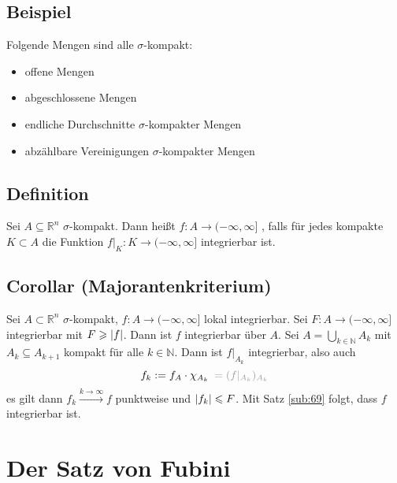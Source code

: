 \subsection[Beispiel: $\sigma$-kompakte Mengen]{Beispiel} %
\label{sub:613}
Folgende Mengen sind alle $\sigma$-kompakt:
\begin{multicols}{2}
	\begin{itemize}
		\item offene Mengen
		\item abgeschlossene Mengen
		\item endliche Durchschnitte $\sigma$-kompakter Mengen
		\item abzählbare Vereinigungen $\sigma$-kompakter Mengen
	\end{itemize}
\end{multicols}

\subsection[Definition: lokal integrierbar]{Definition} %
\label{sub:614}
Sei $A \subseteq \mathds{R}^n$ $\sigma$-kompakt. Dann heißt $f : A \to (-\infty, \infty]$ , falls für jedes kompakte $K \subset A$ die Funktion
$f|_K : K \to (-\infty,\infty]$ integrierbar ist.

\subsection{Corollar (Majorantenkriterium)} %
\label{sub:615}
Sei $A \subset \mathds{R}^n$ $\sigma$-kompakt, $f : A \to (-\infty, \infty]$ lokal integrierbar. Sei $F : A \to (-\infty, \infty]$ integrierbar mit $F\ge \abs*{f} $.
Dann ist $f$ integrierbar über $A$.
Sei $A= \bigcup_{k \in \mathds{N}} A_k$ mit $A_k \subseteq A_{k+1}$ kompakt für alle $k \in \mathds{N}$. Dann ist $f|_{A_k}$ integrierbar, also auch 
\[
	f_k := f_A \cdot \chi_{A_k} \enspace{\color{light_gray} = (f|_{A_k})_{A_k}}
\]
es gilt dann $f_k \xrightarrow{k \to \infty}  f$ punktweise und $\abs*{f_k} \le F $. Mit Satz \ref{sub:69} folgt, dass $f$ integrierbar ist. \bewende
\newpage

\section{Der Satz von Fubini} %
\label{sec:7}
